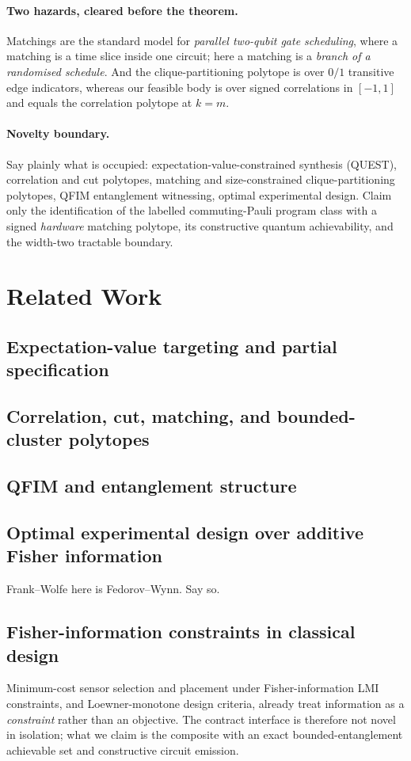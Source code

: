 \documentclass[11pt]{article}
\begin{document}
\paragraph{Two hazards, cleared before the theorem.}
Matchings are the standard model for \emph{parallel two-qubit gate scheduling}, where a
matching is a time slice inside one circuit; here a matching is a \emph{branch of a randomised
schedule}. And the clique-partitioning polytope is over $0/1$ transitive edge indicators,
whereas our feasible body is over signed correlations in $[-1,1]$ and equals the correlation
polytope at $k=m$.

\paragraph{Novelty boundary.}
Say plainly what is occupied: expectation-value-constrained synthesis (QUEST), correlation
and cut polytopes, matching and size-constrained clique-partitioning polytopes, QFIM
entanglement witnessing, optimal experimental design. Claim only the identification of the
labelled commuting-Pauli program class with a signed \emph{hardware} matching polytope, its
constructive quantum achievability, and the width-two tractable boundary.

\section{Related Work}
\subsection{Expectation-value targeting and partial specification}
\subsection{Correlation, cut, matching, and bounded-cluster polytopes}
\subsection{QFIM and entanglement structure}
\subsection{Optimal experimental design over additive Fisher information}
Frank--Wolfe here is Fedorov--Wynn. Say so.
\subsection{Fisher-information constraints in classical design}
Minimum-cost sensor selection and placement under Fisher-information LMI constraints, and
Loewner-monotone design criteria, already treat information as a \emph{constraint} rather than
an objective. The contract interface is therefore not novel in isolation; what we claim is the
composite with an exact bounded-entanglement achievable set and constructive circuit emission.
\end{document}

